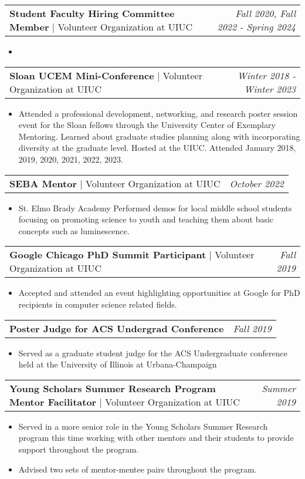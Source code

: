 \documentclass[letterpaper,10pt]{article}
\makeatletter
\newcommand{\experienceitemvspace}{3pt}
\newcommand{\resumeItem}[1]{
  \item{
    {#1 \vspace{-4pt}}
  }
}
\newcommand{\titleItem}[1]{
  \textbf{#1}
}
\newcommand{\resumeProjectHeading}[2]{
    \item
    \begin{tabular*}{0.97\textwidth}{l@{\extracolsep{\fill}}r}
      #1 & \textit{ #2} \\
    \end{tabular*}\vspace{-9pt}
}
\newcommand{\resumeItemListStart}{
\begin{itemize}}
\newcommand{\resumeItemListEnd}{
\end{itemize}\vspace{-8pt}}
\makeatother
\begin{document}
\vspace{\experienceitemvspace}
\resumeProjectHeading
{\titleItem{{Student Faculty Hiring Committee Member}} $|$ Volunteer Organization at UIUC}{\textcolor{color2}{Fall 2020, Fall 2022 - Spring 2024}}
\vspace{2pt}
\resumeItemListStart
\resumeItem{}
\resumeItemListEnd

\vspace{\experienceitemvspace}
\resumeProjectHeading
{\titleItem{{Sloan UCEM Mini-Conference}} $|$ Volunteer Organization at UIUC}{\textcolor{color2}{Winter 2018 - Winter 2023}}
\vspace{2pt}
\resumeItemListStart
\resumeItem{Attended a professional development, networking, and research poster session event for 	the Sloan fellows through the University Center of Exemplary Mentoring. Learned about 	graduate studies planning along with incorporating diversity at the graduate level. Hosted 	at the UIUC. Attended January 2018, 2019, 2020, 2021, 2022, 2023.}
\resumeItemListEnd

\vspace{\experienceitemvspace}
\resumeProjectHeading
{\titleItem{{SEBA Mentor}} $|$ Volunteer Organization at UIUC}{\textcolor{color2}{October 2022}}
\vspace{2pt}
\resumeItemListStart
\resumeItem{St. Elmo Brady Academy Performed demos for local middle school students focusing on promoting science to youth and teaching them about basic concepts such as luminescence.}
\resumeItemListEnd

\vspace{\experienceitemvspace}
\resumeProjectHeading
{\titleItem{{Google Chicago PhD Summit Participant}} $|$ Volunteer Organization at UIUC}{\textcolor{color2}{Fall 2019}}
\vspace{2pt}
\resumeItemListStart
\resumeItem{Accepted and attended an event highlighting opportunities at Google for PhD recipients in computer science related fields.}
\resumeItemListEnd

\vspace{\experienceitemvspace}
\resumeProjectHeading
{\titleItem{{Poster Judge for ACS Undergrad Conference }}} {\textcolor{color2}{Fall 2019}}
\vspace{2pt}
\resumeItemListStart
\resumeItem{Served as a graduate student judge for the ACS Undergraduate conference held at the 	University of Illinois at Urbana-Champaign}
\resumeItemListEnd

\vspace{\experienceitemvspace}
\resumeProjectHeading
{\titleItem{{Young Scholars Summer Research Program Mentor Facilitator }} $|$ Volunteer Organization at UIUC}{\textcolor{color2}{Summer 2019}}
\vspace{2pt}
\resumeItemListStart
\resumeItem{Served in a more senior role in the Young Scholars Summer Research program this time working with other mentors and their students to provide support throughout the 	program.}
\resumeItem{Advised two sets of mentor-mentee pairs throughout the program.}
\resumeItemListEnd
\end{document}
